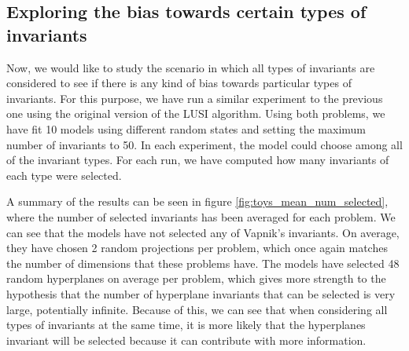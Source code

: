 \subsection{Exploring the bias towards certain types of invariants}

Now, we would like to study the scenario in which all types of invariants are considered to see if there is
any kind of bias towards particular types of invariants. For this purpose, we have run a similar experiment to
the previous one using the original version of the LUSI algorithm. Using both problems, we have fit 10 models
using different random states and setting the maximum number of invariants to 50. In each experiment, the model could
choose among all of the invariant types. For each run, we have computed how many invariants of each
type were selected.

A summary of the results can be seen in figure \ref{fig:toys_mean_num_selected}, where the number of
selected invariants has been averaged for each problem. We can see that the models have not selected any of
Vapnik's invariants. On average, they have chosen 2 random projections per problem, which once again matches
the number of dimensions that these problems have. The models have selected 48 random hyperplanes on average
per problem, which gives more strength to the hypothesis that the number of hyperplane invariants that
can be selected is very large, potentially infinite. Because of this, we can see that when considering
all types of invariants at the same time, it is more likely that the hyperplanes invariant will be selected
because it can contribute with more information.

